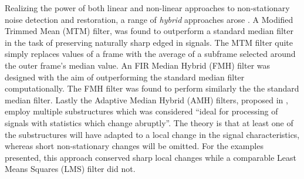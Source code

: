 Realizing the power of both linear and non-linear approaches to non-stationary noise detection and restoration, a range of \emph{hybrid} approaches arose\cite{Nieminen1987a}\cite{Lee1985} \cite{Heinonen1987}. A Modified Trimmed Mean (MTM) filter, was found to outperform a standard median filter in the task of preserving naturally sharp edged in signals\cite{Lee1985}. The MTM filter quite simply replaces values of a frame with the average of a subframe selected around the outer frame's median value\cite{Lee1985}. An FIR Median Hybrid (FMH) filter was designed with the aim of outperforming the standard median filter computationally. The FMH filter was found to perform similarly the the standard median filter\cite{Heinonen1987}. Lastly the Adaptive Median Hybrid (AMH) filters, proposed in \cite{Nieminen1987a}, employ multiple substructures which was considered ``ideal for processing of signals with statistics which change abruptly''. The theory is that at least one of the substructures will have adapted to a local change in the signal characteristics, whereas short non-stationary changes will be omitted. For the examples presented, this approach conserved sharp local changes while a comparable Least Means Squares (LMS) filter did not\cite{Nieminen1987a}.





